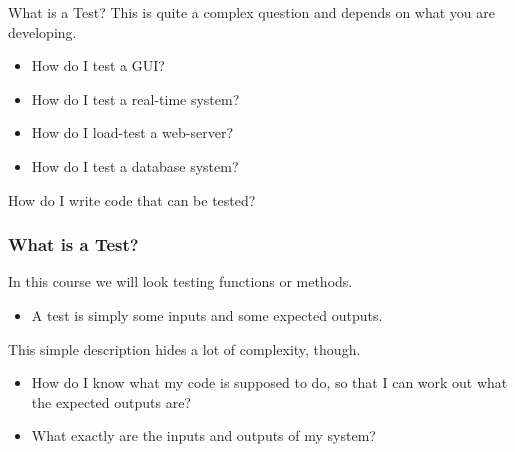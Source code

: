\documentclass{beamer}
\begin{document}
\begin{frame}{What is a Test?}
  This is quite a complex question and depends on what you are
  developing.
  \begin{itemize}
  \item How do I test a GUI?
  \item How do I test a real-time system?
  \item How do I load-test a web-server?
  \item How do I test a database system?
  \end{itemize}
  How do I write code that can be tested?
  
\end{frame}
\begin{frame}
  \frametitle{What is a Test?}
In this course we will look testing functions or methods. 
  \begin{itemize}
  \item A test is simply some inputs and some expected outputs.
  \end{itemize}
  This simple description hides a lot of complexity, though.
  \begin{itemize}
  \item How do I know what my code is supposed to do, so that I can
    work out what the expected outputs are?
  \item   What exactly are the inputs and outputs of my system?
  \end{itemize}

\end{frame}
\end{document}
